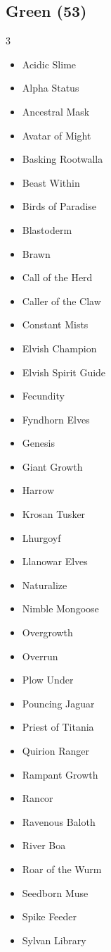 \documentclass[11pt]{article}
\begin{document}
\subsection*{Green (53)}
\begin{multicols}{3}
\footnotesize
\begin{itemize}[leftmargin=1em,itemsep=0pt,parsep=0pt]
\item Acidic Slime
\item Alpha Status
\item Ancestral Mask
\item Avatar of Might
\item Basking Rootwalla
\item Beast Within
\item Birds of Paradise
\item Blastoderm
\item Brawn
\item Call of the Herd
\item Caller of the Claw
\item Constant Mists
\item Elvish Champion
\item Elvish Spirit Guide
\item Fecundity
\item Fyndhorn Elves
\item Genesis
\item Giant Growth
\item Harrow
\item Krosan Tusker
\item Lhurgoyf
\item Llanowar Elves
\item Naturalize
\item Nimble Mongoose
\item Overgrowth
\item Overrun
\item Plow Under
\item Pouncing Jaguar
\item Priest of Titania
\item Quirion Ranger
\item Rampant Growth
\item Rancor
\item Ravenous Baloth
\item River Boa
\item Roar of the Wurm
\item Seedborn Muse
\item Spike Feeder
\item Sylvan Library

\end{itemize}
\end{multicols}
\end{document}
